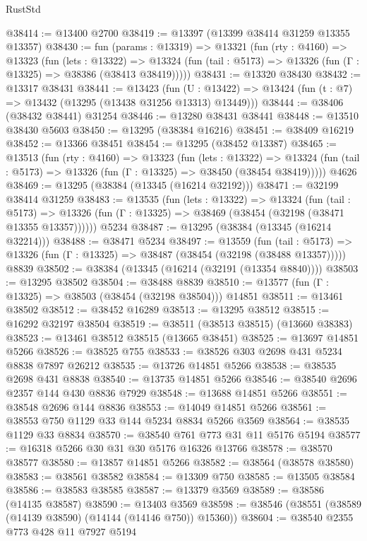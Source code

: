 \begin{lexlean}{RustStd}
\begin{coremodule}
@38414 := @13400 @2700
@38419 := @13397 (@13399 @38414 @31259 @13355 @13357)
@38430 := fun (params : @13319) =>
  @13321
    (fun (rty : @4160) =>
    @13323
      (fun (lets : @13322) =>
      @13324 (fun (tail : @5173) => @13326 (fun (Γ : @13325) => @38386 (@38413 @38419)))))
@38431 := @13320 @38430
@38432 := @13317 @38431
@38441 := @13423
    (fun (U : @13422) => @13424 (fun (t : @7) => @13432 (@13295 (@13438 @31256 @13313) @13449)))
@38444 := @38406 (@38432 @38441) @31254
@38446 := @13280 @38431 @38441
@38448 := @13510 @38430 @5603
@38450 := @13295 (@38384 @16216)
@38451 := @38409 @16219
@38452 := @13366 @38451
@38454 := @13295 (@38452 @13387)
@38465 := @13513
    (fun (rty : @4160) =>
    @13323
      (fun (lets : @13322) =>
      @13324 (fun (tail : @5173) => @13326 (fun (Γ : @13325) => @38450 (@38454 @38419)))))
    @4626
@38469 := @13295 (@38384 (@13345 (@16214 @32192)))
@38471 := @32199 @38414 @31259
@38483 := @13535
    (fun (lets : @13322) =>
    @13324
      (fun (tail : @5173) =>
      @13326 (fun (Γ : @13325) => @38469 (@38454 (@32198 (@38471 @13355 @13357))))))
    @5234
@38487 := @13295 (@38384 (@13345 (@16214 @32214)))
@38488 := @38471 @5234
@38497 := @13559
    (fun (tail : @5173) => @13326 (fun (Γ : @13325) => @38487 (@38454 (@32198 (@38488 @13357)))))
    @8839
@38502 := @38384 (@13345 (@16214 (@32191 (@13354 @8840))))
@38503 := @13295 @38502
@38504 := @38488 @8839
@38510 := @13577 (fun (Γ : @13325) => @38503 (@38454 (@32198 @38504))) @14851
@38511 := @13461 @38502
@38512 := @38452 @16289
@38513 := @13295 @38512
@38515 := @16292 @32197 @38504
@38519 := @38511 (@38513 @38515) (@13660 @38383)
@38523 := @13461 @38512 @38515 (@13665 @38451)
@38525 := @13697 @14851 @5266
@38526 := @38525 @755
@38533 := @38526 @303 @2698 @431 @5234 @8838 @7897 @26212
@38535 := @13726 @14851 @5266
@38538 := @38535 @2698 @431 @8838
@38540 := @13735 @14851 @5266
@38546 := @38540 @2696 @2357 @144 @430 @8836 @7929
@38548 := @13688 @14851 @5266
@38551 := @38548 @2696 @144 @8836
@38553 := @14049 @14851 @5266
@38561 := @38553 @750 @1129 @33 @144 @5234 @8834 @5266 @3569
@38564 := @38535 @1129 @33 @8834
@38570 := @38540 @761 @773 @31 @11 @5176 @5194
@38577 := @16318 @5266 @30 @31 @30 @5176 @16326 @13766
@38578 := @38570 @38577
@38580 := @13857 @14851 @5266
@38582 := @38564 (@38578 @38580)
@38583 := @38561 @38582
@38584 := @13309 @750
@38585 := @13505 @38584
@38586 := @38583 @38585
@38587 := @13379 @3569
@38589 := @38586 (@14135 @38587)
@38590 := @13403 @3569
@38598 := @38546 (@38551 (@38589 (@14139 @38590) (@14144 (@14146 @750)) @15360))
@38604 := @38540 @2355 @773 @428 @11 @7927 @5194

\end{coremodule}
\end{lexlean}
